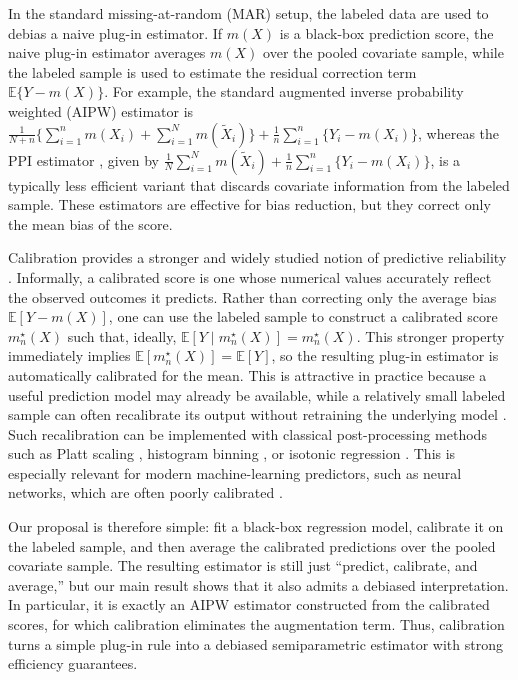 \documentclass{article}
\theoremstyle{plain}
\theoremstyle{definition}
\newcommand{\E}{\mathbb{E}}
\newcommand{\1}{\mathbbm{1}}
\begin{document}
In the standard missing-at-random (MAR) setup, the labeled data are used to debias a naive plug-in estimator. If \(m(X)\) is a black-box prediction score, the naive plug-in estimator averages \(m(X)\) over the pooled covariate sample, while the labeled sample is used to estimate the residual correction term \(\mathbb{E}\{Y-m(X)\}\). For example, the standard augmented inverse probability weighted (AIPW) estimator \citep{robins1995analysis} is \(\frac{1}{N+n}\{\sum_{i=1}^n m(X_i)+\sum_{i=1}^N m(\widetilde X_i)\}+\frac{1}{n}\sum_{i=1}^n \{Y_i-m(X_i)\}\), whereas the PPI estimator \citep{ppi2023}, given by \(\frac{1}{N}\sum_{i=1}^N m(\widetilde X_i)+\frac{1}{n}\sum_{i=1}^n \{Y_i-m(X_i)\}\), is a typically less efficient variant that discards covariate information from the labeled sample. These estimators are effective for bias reduction, but they correct only the mean bias of the score.


Calibration provides a stronger and widely studied notion of predictive reliability \citep{zadrozny2001obtaining,zadrozny2002transforming,niculescu2005predicting}. Informally, a calibrated score is one whose numerical values accurately reflect the observed outcomes it predicts. Rather than correcting only the average bias \(\E[Y-m(X)]\), one can use the labeled sample to construct a calibrated score \(m_n^\star(X)\) such that, ideally, \(\E[Y \mid m_n^\star(X)]=m_n^\star(X)\). This stronger property immediately implies \(\E[m_n^\star(X)]=\E[Y]\), so the resulting plug-in estimator is automatically calibrated for the mean. This is attractive in practice because a useful prediction model may already be available, while a relatively small labeled sample can often recalibrate its output without retraining the underlying model \citep{roth2022uncertain}. Such recalibration can be implemented with classical post-processing methods such as Platt scaling \citep{platt1999probabilistic}, histogram binning \citep{zadrozny2001obtaining}, or isotonic regression \citep{zadrozny2002transforming}. This is especially relevant for modern machine-learning predictors, such as neural networks, which are often poorly calibrated \citep{bella2010calibration,guo2017calibration,wang2023calibration}.

 

Our proposal is therefore simple: fit a black-box regression model, calibrate it on the labeled sample, and then average the calibrated predictions over the pooled covariate sample. The resulting estimator is still just ``predict, calibrate, and average,'' but our main result shows that it also admits a debiased interpretation. In particular, it is exactly an AIPW estimator constructed from the calibrated scores, for which calibration eliminates the augmentation term. Thus, calibration turns a simple plug-in rule into a debiased semiparametric estimator \citep{robins1995analysis,bang2005doubly,vanderLaanRose2011,DoubleML} with strong efficiency guarantees. 
\end{document}
